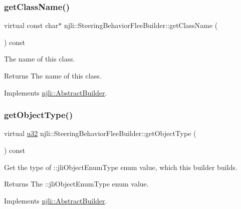 \subsubsection{\texorpdfstring{get\+Class\+Name()}{getClassName()}}
{\footnotesize\ttfamily virtual const char$\ast$ njli\+::\+Steering\+Behavior\+Flee\+Builder\+::get\+Class\+Name (\begin{DoxyParamCaption}{ }\end{DoxyParamCaption}) const\hspace{0.3cm}{\ttfamily [virtual]}}

The name of this class.

\begin{DoxyReturn}{Returns}
The name of this class. 
\end{DoxyReturn}


Implements \mbox{\hyperlink{classnjli_1_1_abstract_builder_a902f73ea78031b06aca183a417f3413b}{njli\+::\+Abstract\+Builder}}.

\mbox{\label{classnjli_1_1_steering_behavior_flee_builder_a670080c9d52cee1096c828e38ae2dd31}} 
\subsubsection{\texorpdfstring{get\+Object\+Type()}{getObjectType()}}
{\footnotesize\ttfamily virtual \mbox{\hyperlink{_util_8h_a10e94b422ef0c20dcdec20d31a1f5049}{u32}} njli\+::\+Steering\+Behavior\+Flee\+Builder\+::get\+Object\+Type (\begin{DoxyParamCaption}{ }\end{DoxyParamCaption}) const\hspace{0.3cm}{\ttfamily [virtual]}}

Get the type of \+::jli\+Object\+Enum\+Type enum value, which this builder builds.

\begin{DoxyReturn}{Returns}
The \+::jli\+Object\+Enum\+Type enum value. 
\end{DoxyReturn}


Implements \mbox{\hyperlink{classnjli_1_1_abstract_builder_a0f2d344fcf697b167f4f2b1122b5fb33}{njli\+::\+Abstract\+Builder}}.

